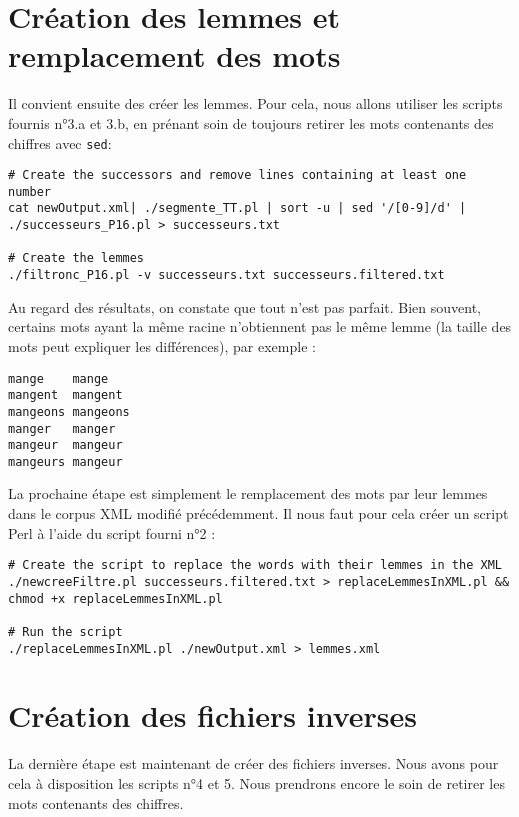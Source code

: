 \section{Création des lemmes et remplacement des mots}

Il convient ensuite des créer les lemmes. Pour cela, nous allons utiliser les scripts fournis n°3.a et 3.b, en prénant soin de toujours retirer les mots contenants des chiffres avec \lstinline{sed}:

\fakeshell
\begin{lstlisting}
# Create the successors and remove lines containing at least one number
cat newOutput.xml| ./segmente_TT.pl | sort -u | sed '/[0-9]/d' | ./successeurs_P16.pl > successeurs.txt

# Create the lemmes
./filtronc_P16.pl -v successeurs.txt successeurs.filtered.txt
\end{lstlisting}

Au regard des résultats, on constate que tout n'est pas parfait. Bien souvent, certains mots ayant la même racine n'obtiennent pas le même lemme (la taille des mots peut expliquer les différences), par exemple :

\begin{lstlisting}
mange    mange
mangent  mangent
mangeons mangeons
manger   manger
mangeur  mangeur
mangeurs mangeur
\end{lstlisting}

\medskip

La prochaine étape est simplement le remplacement des mots par leur lemmes dans le corpus XML modifié précédemment. Il nous faut pour cela créer un script Perl à l'aide du script fourni n°2 :

\begin{lstlisting}
# Create the script to replace the words with their lemmes in the XML
./newcreeFiltre.pl successeurs.filtered.txt > replaceLemmesInXML.pl && chmod +x replaceLemmesInXML.pl

# Run the script
./replaceLemmesInXML.pl ./newOutput.xml > lemmes.xml
\end{lstlisting}

\section{Création des fichiers inverses}

La dernière étape est maintenant de créer des fichiers inverses. Nous avons pour cela à disposition les scripts n°4 et 5. Nous prendrons encore le soin de retirer les mots contenants des chiffres.

